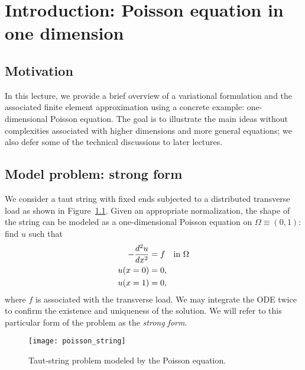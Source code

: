 \chapter{Introduction: Poisson equation in one dimension}

\disclaimer

\section{Motivation}
In this lecture, we provide a brief overview of a variational formulation and the associated finite element approximation using a concrete example: one-dimensional Poisson equation. The goal is to illustrate the main ideas without complexities associated with higher dimensions and more general equations; we also defer some of the technical discussions to later lectures.

\section{Model problem: strong form}
\label{sec:pos1d_strong}
We consider a taut string with fixed ends subjected to a distributed transverse load as shown in Figure~\ref{fig:pos1d_string}.  Given an appropriate normalization, the shape of the string can be modeled as a one-dimensional Poisson equation on $\Omega \equiv (0,1)$: find $u$ such that
\begin{align}
  - \frac{d ^2u}{d x^2} &= f \quad \text{in } \Omega  \label{eq:pos1d_strong} \\
  u(x=0) &= 0 \notag , \\
  u(x=1) &= 0 \notag ,
\end{align}
where $f$ is associated with the transverse load.  We may integrate the ODE twice to confirm the existence and uniqueness of the solution.  We will refer to this particular form of the problem as the \emph{strong form}.

\begin{figure}
  \centering
  \texttt{[image: poisson\_string]}
  \caption{Taut-string problem modeled by the Poisson equation. \label{fig:pos1d_string}}
\end{figure}


